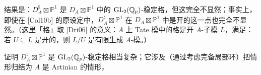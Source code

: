 结果是：$D_A^\natural\boxtimes\mathbb P^1$ 是 $D_A\boxtimes\mathbb P^1$ 中的 $\mathrm{GL}_2(\mathbb{Q}_p)$-稳定格，但这完全不显然；事实上，即使在 [Col10b] 的原设定中，$D_A^\natural\boxtimes\mathbb P^1$ 在 $D_A\boxtimes\mathbb P^1$ 中是开的这一点也完全不显然。（这里「格」取 [Dri06] 的意义：$A$ 上 Tate 模中的格是开 $A$-子模 $L$，满足：若 $U\subseteq L$ 是开的，则 $L/U$ 是有限生成 $A$-模。）

证明 $D_A^\natural\boxtimes\mathbb P^1$ 是 $\mathrm{GL}_2(\mathbb{Q}_p)$-稳定格相当复杂；它涉及（通过考虑完备局部环）把情形归结为 $A$ 是 Artinian 的情形，


